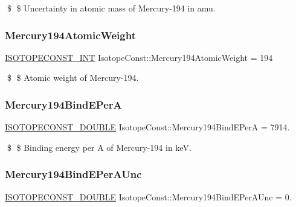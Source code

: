 \$ \$ Uncertainty in atomic mass of Mercury-\/194 in amu. \mbox{\label{group___isotope_const-_mercury-_hg194_gab085cfba055fdd9612847df7e4d4553d}} 
\subsubsection{\texorpdfstring{Mercury194\+Atomic\+Weight}{Mercury194AtomicWeight}}
{\footnotesize\ttfamily \mbox{\hyperlink{group___isotope_const-_macros_ga5f18360b3e99483a35c32d789e62621c}{I\+S\+O\+T\+O\+P\+E\+C\+O\+N\+S\+T\+\_\+\+I\+NT}} Isotope\+Const\+::\+Mercury194\+Atomic\+Weight = 194}

\$ \$ Atomic weight of Mercury-\/194. \mbox{\label{group___isotope_const-_mercury-_hg194_ga66e7c14a3b0acaeaf395060b6e25991c}} 
\subsubsection{\texorpdfstring{Mercury194\+Bind\+E\+PerA}{Mercury194BindEPerA}}
{\footnotesize\ttfamily \mbox{\hyperlink{group___isotope_const-_macros_ga8f45a7272ce02c0b4c65c44636ed719a}{I\+S\+O\+T\+O\+P\+E\+C\+O\+N\+S\+T\+\_\+\+D\+O\+U\+B\+LE}} Isotope\+Const\+::\+Mercury194\+Bind\+E\+PerA = 7914.}

\$ \$ Binding energy per A of Mercury-\/194 in keV. \mbox{\label{group___isotope_const-_mercury-_hg194_ga132a7993e5cdfc269924cc1b4c855435}} 
\subsubsection{\texorpdfstring{Mercury194\+Bind\+E\+Per\+A\+Unc}{Mercury194BindEPerAUnc}}
{\footnotesize\ttfamily \mbox{\hyperlink{group___isotope_const-_macros_ga8f45a7272ce02c0b4c65c44636ed719a}{I\+S\+O\+T\+O\+P\+E\+C\+O\+N\+S\+T\+\_\+\+D\+O\+U\+B\+LE}} Isotope\+Const\+::\+Mercury194\+Bind\+E\+Per\+A\+Unc = 0.}

